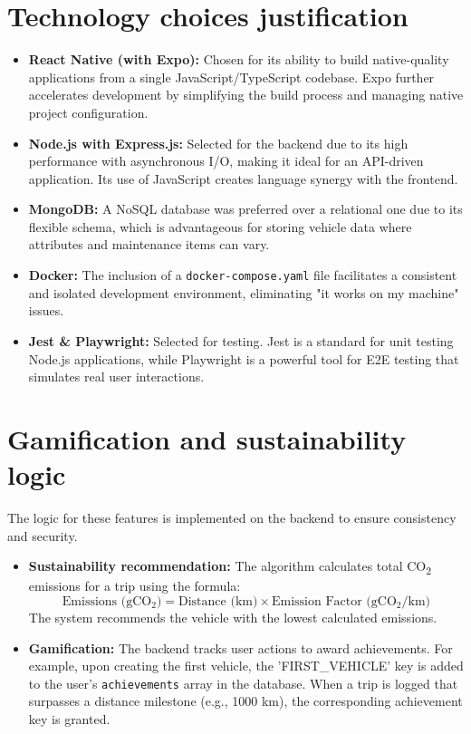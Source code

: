 \section{Technology choices justification}
\begin{itemize}
    \item \textbf{React Native (with Expo):} Chosen for its ability to build native-quality applications from a single JavaScript/TypeScript codebase. Expo further accelerates development by simplifying the build process and managing native project configuration.
    \item \textbf{Node.js with Express.js:} Selected for the backend due to its high performance with asynchronous I/O, making it ideal for an API-driven application. Its use of JavaScript creates language synergy with the frontend.
    \item \textbf{MongoDB:} A NoSQL database was preferred over a relational one due to its flexible schema, which is advantageous for storing vehicle data where attributes and maintenance items can vary.
    \item \textbf{Docker:} The inclusion of a \texttt{docker-compose.yaml} file facilitates a consistent and isolated development environment, eliminating "it works on my machine" issues.
    \item \textbf{Jest \& Playwright:} Selected for testing. Jest is a standard for unit testing Node.js applications, while Playwright is a powerful tool for E2E testing that simulates real user interactions.
\end{itemize}

\section{Gamification and sustainability logic}
The logic for these features is implemented on the backend to ensure consistency and security.
\begin{itemize}
    \item \textbf{Sustainability recommendation:} The algorithm calculates total CO\textsubscript{2} emissions for a trip using the formula:
    \begin{equation}
        \text{Emissions (gCO$_2$)} = \text{Distance (km)} \times \text{Emission Factor (gCO$_2$/km)}
    \end{equation}
    The system recommends the vehicle with the lowest calculated emissions.
    \item \textbf{Gamification:} The backend tracks user actions to award achievements. For example, upon creating the first vehicle, the 'FIRST\_VEHICLE' key is added to the user's \texttt{achievements} array in the database. When a trip is logged that surpasses a distance milestone (e.g., 1000 km), the corresponding achievement key is granted.
\end{itemize}
